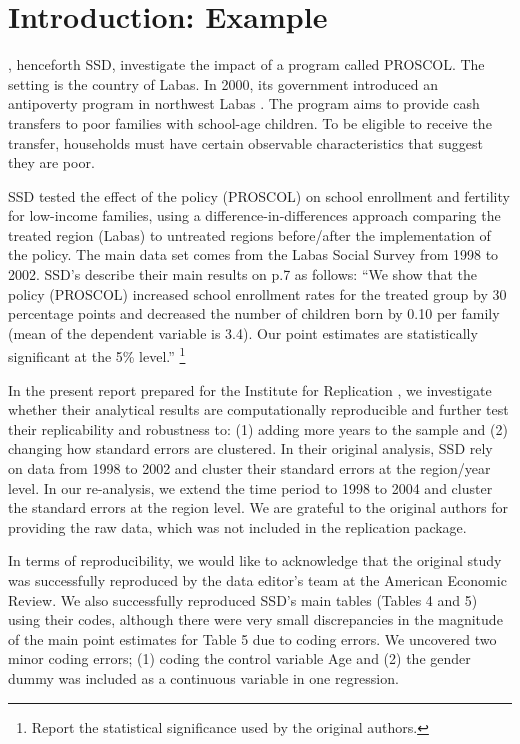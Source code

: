 \documentclass[12pt,a4paper]{article}
\begin{document}
\section{Introduction: Example}
\begin{spacing}{1.5}
\cite{analyst_2022}, henceforth SSD, investigate the impact of a program called PROSCOL. The setting is the country of Labas. In 2000, its government introduced an antipoverty program in northwest Labas \citep{ravallion2001mystery}. The program aims to provide cash transfers to poor families with school-age children. To be eligible to receive the transfer, households must have certain observable characteristics that suggest they are poor.

SSD tested the effect of the policy (PROSCOL) on school enrollment and fertility for low-income families, using a difference-in-differences approach comparing the treated region (Labas) to untreated regions before/after the implementation of the policy. The main data set comes from the Labas Social Survey from 1998 to 2002. SSD's describe their main results on p.7 as follows:  ``We show that the policy (PROSCOL) increased school enrollment rates for the treated group by 30 percentage points and decreased the number of children born by 0.10 per family (mean of the dependent variable is 3.4). Our point estimates are statistically significant at the 5\% level.''%
\footnote{Report the statistical significance used by the original authors.}

In the present report prepared for the Institute for Replication \citep{I4R_MetaPaper}, we investigate whether their analytical results are computationally reproducible and further test their replicability and robustness to: (1) adding more years to the sample and (2) changing how standard errors are clustered. In their original analysis, SSD rely on data from 1998 to 2002 and cluster their standard errors at the region/year level. In our re-analysis, we extend the time period to 1998 to 2004 and cluster the standard errors at the region level. We are grateful to the original authors for providing the raw data, which was not included in the replication package.  

In terms of reproducibility, we would like to acknowledge that the original study was successfully reproduced by the data editor's team at the American Economic Review. We also successfully reproduced SSD's main tables (Tables 4 and 5) using their codes, although there were very small discrepancies in the magnitude of the main point estimates for Table 5 due to coding errors. We uncovered two minor coding errors; (1) coding the control variable Age and (2) the gender dummy was included as a continuous variable in one regression. 


\end{spacing}
\end{document}

